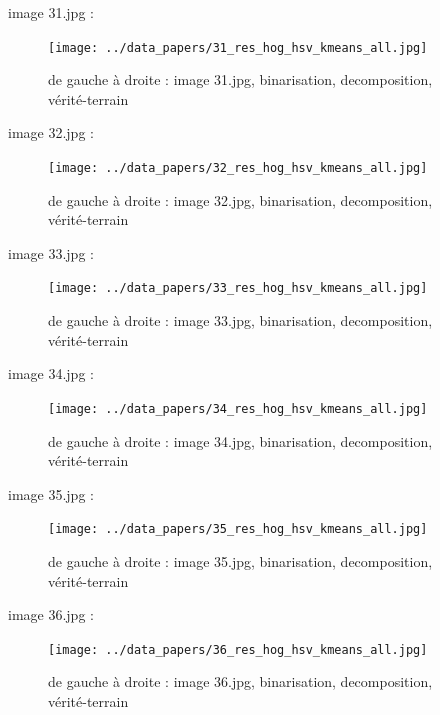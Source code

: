 \documentclass{book}
\begin{document}
image 31.jpg : 
\begin{figure}[H]
\begin{center}
\texttt{[image: ../data\_papers/31\_res\_hog\_hsv\_kmeans\_all.jpg]}
\end{center}
\caption{de gauche à droite : image 31.jpg, binarisation, decomposition, vérité-terrain}
\label{31}
\end{figure}
\clearpage


image 32.jpg : 
\begin{figure}[H]
\begin{center}
\texttt{[image: ../data\_papers/32\_res\_hog\_hsv\_kmeans\_all.jpg]}
\end{center}
\caption{de gauche à droite : image 32.jpg, binarisation, decomposition, vérité-terrain}
\label{32}
\end{figure}
\clearpage


image 33.jpg : 
\begin{figure}[H]
\begin{center}
\texttt{[image: ../data\_papers/33\_res\_hog\_hsv\_kmeans\_all.jpg]}
\end{center}
\caption{de gauche à droite : image 33.jpg, binarisation, decomposition, vérité-terrain}
\label{33}
\end{figure}
\clearpage


image 34.jpg : 
\begin{figure}[H]
\begin{center}
\texttt{[image: ../data\_papers/34\_res\_hog\_hsv\_kmeans\_all.jpg]}
\end{center}
\caption{de gauche à droite : image 34.jpg, binarisation, decomposition, vérité-terrain}
\label{34}
\end{figure}
\clearpage


image 35.jpg : 
\begin{figure}[H]
\begin{center}
\texttt{[image: ../data\_papers/35\_res\_hog\_hsv\_kmeans\_all.jpg]}
\end{center}
\caption{de gauche à droite : image 35.jpg, binarisation, decomposition, vérité-terrain}
\label{35}
\end{figure}
\clearpage


image 36.jpg : 
\begin{figure}[H]
\begin{center}
\texttt{[image: ../data\_papers/36\_res\_hog\_hsv\_kmeans\_all.jpg]}
\end{center}
\caption{de gauche à droite : image 36.jpg, binarisation, decomposition, vérité-terrain}
\label{36}
\end{figure}
\clearpage
\end{document}
